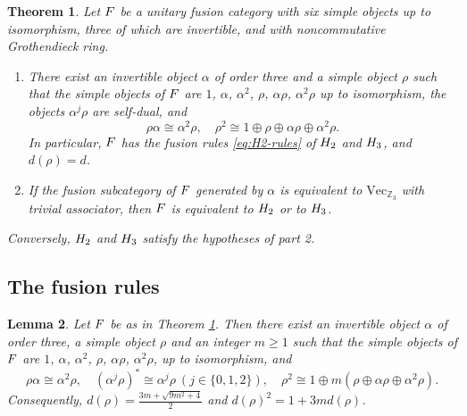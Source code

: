 \documentclass[leqno]{article}
\let\cal\relax
\newcommand{\cal}{\mathcal}
\newcommand{\Z}{\ensuremath{\mathbb{Z}}}
\renewcommand{\geq}{\ensuremath{\geqslant}}
\newtheorem{thm}{Theorem}[section]
\newtheorem{lemma}[thm]{Lemma}
\numberwithin{equation}{section}
\begin{document}
\begin{thm}
\label{thm:recognition}
Let $\cal F$ be a unitary fusion category with six simple objects up to isomorphism, three of which are invertible, and with noncommutative Grothendieck ring.
\begin{enumerate}
\item There exist an invertible object $\alpha$ of order three and a simple object $\rho$ such that the simple objects of $\cal F$ are $1$, $\alpha$, $\alpha^2$, $\rho$, $\alpha\rho$, $\alpha^2\rho$ up to isomorphism, the objects $\alpha^j\rho$ are self-dual, and
\[
\rho\alpha \cong \alpha^2\rho,\quad \rho^2 \cong 1 \oplus \rho \oplus \alpha\rho \oplus \alpha^2\rho.
\]
In particular, $\cal F$ has the fusion rules \eqref{eq:H2-rules} of $\cal H_2$ and $\cal H_3$, and $d(\rho) = d$.
\item If the fusion subcategory of $\cal F$ generated by $\alpha$ is equivalent to $\mathrm{Vec}_{\Z_3}$ with trivial associator, then $\cal F$ is equivalent to $\cal H_2$ or to $\cal H_3$.
\end{enumerate}
Conversely, $\cal H_2$ and $\cal H_3$ satisfy the hypotheses of part 2.
\end{thm}

\subsection{The fusion rules}
\label{subsec:recognition-rules}

\begin{lemma}
\label{lem:ring}
Let $\cal F$ be as in Theorem \ref{thm:recognition}. Then there exist an invertible object $\alpha$ of order three, a simple object $\rho$ and an integer $m \geq 1$ such that the simple objects of $\cal F$ are $1$, $\alpha$, $\alpha^2$, $\rho$, $\alpha\rho$, $\alpha^2\rho$, up to isomorphism, and
\[
\rho\alpha \cong \alpha^2\rho,\quad (\alpha^j\rho)^* \cong \alpha^j\rho \ (j \in \{0,1,2\}),\quad \rho^2 \cong 1 \oplus m(\rho \oplus \alpha\rho \oplus \alpha^2\rho).
\]
Consequently, $d(\rho) = \frac{3m+\sqrt{9m^2+4}}{2}$ and $d(\rho)^2 = 1+3m d(\rho)$.
\end{lemma}
\end{document}
